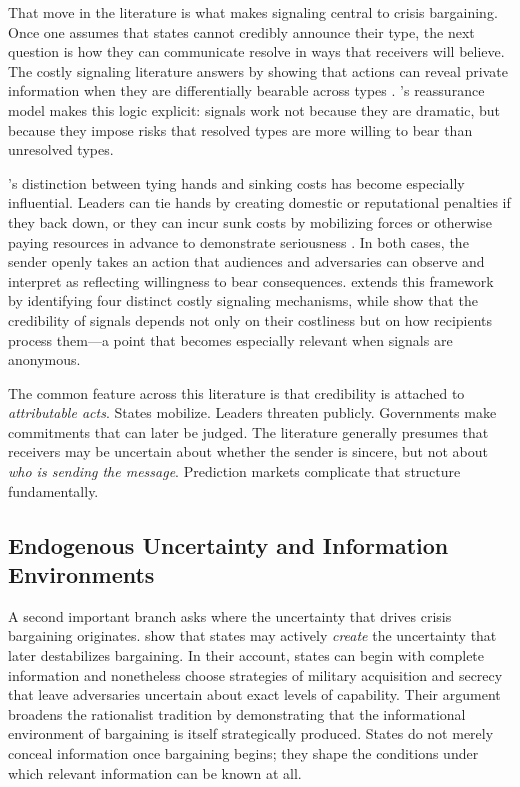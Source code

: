 \documentclass[12pt]{article}
\begin{document}
That move in the literature is what makes signaling central to crisis bargaining. Once one assumes that states cannot credibly announce their type, the next question is how they can communicate resolve in ways that receivers will believe. The costly signaling literature answers by showing that actions can reveal private information when they are differentially bearable across types \citep{spence1973, fearon1997}. \citet{kydd2005}'s reassurance model makes this logic explicit: signals work not because they are dramatic, but because they impose risks that resolved types are more willing to bear than unresolved types.

\citet{fearon1997}'s distinction between tying hands and sinking costs has become especially influential. Leaders can tie hands by creating domestic or reputational penalties if they back down, or they can incur sunk costs by mobilizing forces or otherwise paying resources in advance to demonstrate seriousness \citep{yarhimilokertzer2018}. In both cases, the sender openly takes an action that audiences and adversaries can observe and interpret as reflecting willingness to bear consequences. \citet{quek2021} extends this framework by identifying four distinct costly signaling mechanisms, while \citet{kertzerrathbun2019} show that the credibility of signals depends not only on their costliness but on how recipients process them---a point that becomes especially relevant when signals are anonymous.

The common feature across this literature is that credibility is attached to \textit{attributable acts}. States mobilize. Leaders threaten publicly. Governments make commitments that can later be judged. The literature generally presumes that receivers may be uncertain about whether the sender is sincere, but not about \textit{who is sending the message}. Prediction markets complicate that structure fundamentally.

\subsection{Endogenous Uncertainty and Information Environments}

A second important branch asks where the uncertainty that drives crisis bargaining originates. \citet{meirowitzandsartori2008} show that states may actively \textit{create} the uncertainty that later destabilizes bargaining. In their account, states can begin with complete information and nonetheless choose strategies of military acquisition and secrecy that leave adversaries uncertain about exact levels of capability. Their argument broadens the rationalist tradition by demonstrating that the informational environment of bargaining is itself strategically produced. States do not merely conceal information once bargaining begins; they shape the conditions under which relevant information can be known at all.
\end{document}
